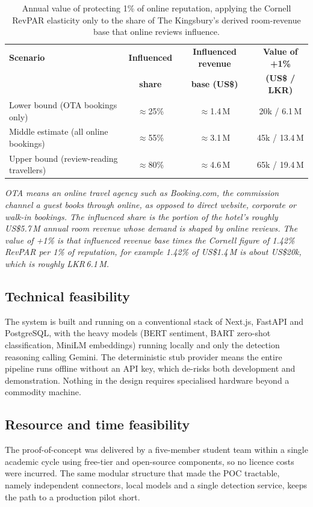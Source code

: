 \documentclass[11pt,a4paper]{article}
\begin{document}
\begin{table}[H]
\centering
\caption{Annual value of protecting 1\% of online reputation, applying the Cornell RevPAR elasticity
only to the share of The Kingsbury's derived room-revenue base that online reviews influence.}
\label{tab:revenue}
\begin{tabularx}{\linewidth}{Xccc}
\toprule
\textbf{Scenario} & \textbf{Influenced} & \textbf{Influenced revenue} & \textbf{Value of +1\%} \\
 & \textbf{share} & \textbf{base (US\$)} & \textbf{(US\$ / LKR)} \\
\midrule
Lower bound (OTA bookings only)        & $\approx$25\% & $\approx$1.4\,M & 20k / 6.1\,M \\
Middle estimate (all online bookings)  & $\approx$55\% & $\approx$3.1\,M & 45k / 13.4\,M \\
Upper bound (review-reading travellers) & $\approx$80\% & $\approx$4.6\,M & 65k / 19.4\,M \\
\bottomrule
\end{tabularx}

\smallskip
{\footnotesize\itshape OTA means an online travel agency such as Booking.com, the commission channel a
guest books through online, as opposed to direct website, corporate or walk-in bookings. The influenced
share is the portion of the hotel's roughly US\$5.7\,M annual room revenue whose demand is shaped by
online reviews. The value of +1\% is that influenced revenue base times the Cornell figure of 1.42\%
RevPAR per 1\% of reputation, for example 1.42\% of US\$1.4\,M is about US\$20k, which is roughly
LKR\,6.1\,M.}
\end{table}

\subsection{Technical feasibility}
The system is built and running on a conventional stack of Next.js, FastAPI and PostgreSQL, with the
heavy models (BERT sentiment, BART zero-shot classification, MiniLM embeddings) running locally and only
the detection reasoning calling Gemini. The deterministic stub provider means the entire pipeline runs
offline without an API key, which de-risks both development and demonstration. Nothing in the design
requires specialised hardware beyond a commodity machine.

\subsection{Resource and time feasibility}
The proof-of-concept was delivered by a five-member student team within a single academic cycle using
free-tier and open-source components, so no licence costs were incurred. The same modular structure that
made the POC tractable, namely independent connectors, local models and a single detection service,
keeps the path to a production pilot short.
\end{document}
